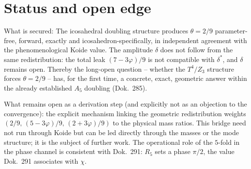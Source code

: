 \section{Status and open edge}
What is secured: The icosahedral doubling structure produces $\theta=2/9$ parameter-free,
forward, exactly and icosahedron-specifically, in independent agreement with the phenomenological
Koide value. The amplitude $\delta$ does not follow from the same redistribution: the total leak
$(7-3\varphi)/9$ is not compatible with $\delta^\ast$, and $\delta$ remains open. Thereby the
long-open question -- whether the $T^4/Z_3$ structure forces $\theta=2/9$ -- has, for the first
time, a concrete, exact, geometric answer within the already established $A_5$ doubling (Dok.~285).

What remains open as a derivation step (and explicitly not as an objection to the convergence):
the explicit mechanism linking the geometric redistribution weights $(2/9,\,(5-3\varphi)/9,\,
(2+3\varphi)/9)$ to the physical mass ratios. This bridge need not run through Koide but can be
led directly through the masses or the mode structure; it is the subject of further work. The
operational role of the $5$-fold in the phase channel is consistent with Dok.~291: $R_5$ sets a
phase $\pi/2$, the value Dok.~291 associates with $\chi$.
